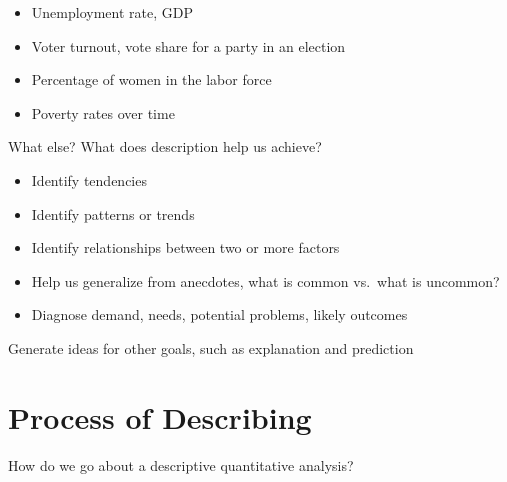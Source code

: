 \documentclass[
  letterpaper,
  DIV=11,
  numbers=noendperiod]{scrreprt}
\providecommand{\tightlist}{%
  \setlength{\itemsep}{0pt}\setlength{\parskip}{0pt}}\usepackage{longtable,booktabs,array}
\begin{document}
\begin{itemize}
\tightlist
\item
  Unemployment rate, GDP
\item
  Voter turnout, vote share for a party in an election
\item
  Percentage of women in the labor force
\item
  Poverty rates over time
\end{itemize}

What else? What does description help us achieve?

\begin{itemize}
\tightlist
\item
  Identify tendencies
\item
  Identify patterns or trends
\item
  Identify relationships between two or more factors
\item
  Help us generalize from anecdotes, what is common vs.~what is
  uncommon?
\item
  Diagnose demand, needs, potential problems, likely outcomes
\end{itemize}

Generate ideas for other goals, such as explanation and prediction

\hypertarget{process-of-describing}{%
\section{Process of Describing}\label{process-of-describing}}

How do we go about a descriptive quantitative analysis?
\end{document}

